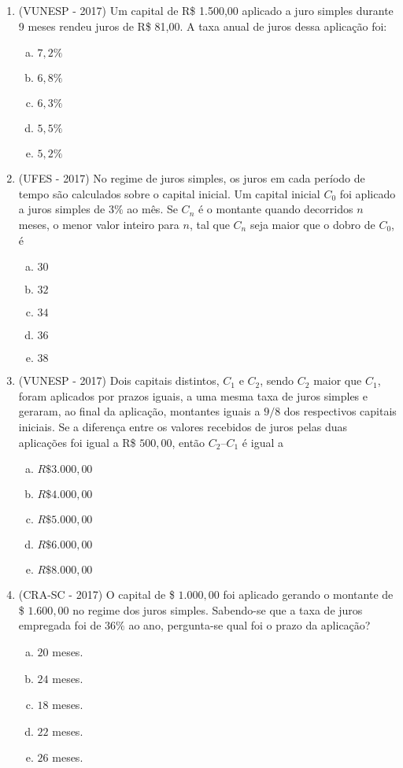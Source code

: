 \begin{enumerate}
  \item (VUNESP - 2017) Um capital de R\$ 1.500,00 aplicado a juro simples durante 9 meses rendeu juros de R\$ 81,00. A taxa anual de juros dessa aplicação foi:
  \begin{enumerate}[a)]
  \item $7,2\%$
  \item $6,8\%$
  \item $6,3\%$
  \item $5,5\%$
  \item $5,2\%$
  \end{enumerate}

  \item (UFES - 2017) No regime de juros simples, os juros em cada período de tempo são calculados sobre o capital inicial. Um capital inicial $C_0$ foi aplicado a juros simples de $3\%$ ao mês. Se $C_n$ é o montante quando decorridos $n$ meses, o menor valor inteiro para $n$, tal que $C_n$ seja maior que o dobro de $C_0$, é
  \begin{enumerate}[a)]
  \item $30$
  \item $32$
  \item $34$
  \item $36$
  \item $38$
  \end{enumerate}

  \item (VUNESP - 2017) Dois capitais distintos, $C_1$ e $C_2$, sendo $C_2$ maior que $C_1$, foram aplicados por prazos iguais, a uma mesma taxa de juros simples e geraram, ao final da aplicação, montantes iguais a $9/8$ dos respectivos capitais iniciais. Se a diferença entre os valores recebidos de juros pelas duas aplicações foi igual a R\$ $500,00$, então $C_2 – C_1$ é igual a
  \begin{enumerate}[a)]
  \item $R\$ 3.000,00$
  \item $R\$ 4.000,00$
  \item $R\$ 5.000,00$
  \item $R\$ 6.000,00$
  \item $R\$ 8.000,00$
  \end{enumerate}

  \item (CRA-SC - 2017) O capital de \$ $1.000,00$ foi aplicado gerando o montante de \$ $1.600,00$ no regime dos juros simples. Sabendo-se que a taxa de juros empregada foi de $36\%$ ao ano, pergunta-se qual foi o prazo da aplicação?
  \begin{enumerate}[a)]
  \item $20$ meses.
  \item $24$ meses.
  \item $18$ meses.
  \item $22$ meses.
  \item $26$ meses.
  \end{enumerate}


\end{enumerate}
